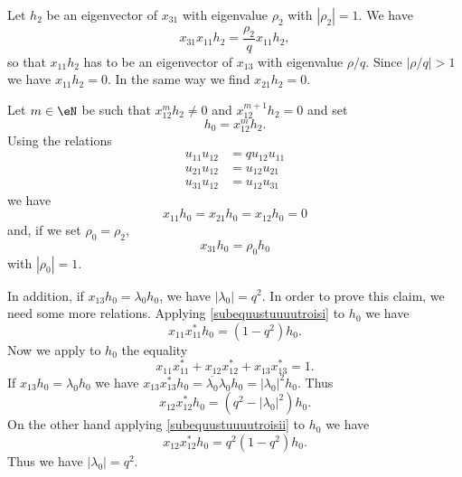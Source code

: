 Let \( h_2\) be an eigenvector of \( x_{31}\) with eigenvalue \( \rho_2\) with \( | \rho_2 |=1\). We have
\begin{equation}
	x_{31}x_{11}h_2=\frac{ \rho_2 }{ q }x_{11}h_2,
\end{equation}
so that \( x_{11}h_2\) has to be an eigenvector of \( x_{13}\) with eigenvalue \( \rho/q\). Since \( | \rho/q |>1\) we have \( x_{11}h_2=0\). In the same way we find \( x_{21}h_2=0\).

Let \( m\in\eN\) be such that \( x_{12}^mh_2\neq 0\) and \( x_{12}^{m+1}h_2=0\) and set
\begin{equation}
	h_0=x_{12}^mh_2.
\end{equation}
Using the relations
\begin{subequations}
	\begin{align}
		u_{11}u_{12} & =qu_{12}u_{11} \\
		u_{21}u_{12} & =u_{12}u_{21}  \\
		u_{31}u_{12} & =u_{12}u_{31}
	\end{align}
\end{subequations}
we have
\begin{equation}
	x_{11}h_0=x_{21}h_0=x_{12}h_0=0
\end{equation}
and, if we set \( \rho_0=\rho_2\),
\begin{equation}
	x_{31}h_0=\rho_0h_0
\end{equation}
with \( | \rho_0 |=1\).

In addition, if \( x_{13}h_0=\lambda_0h_0\), we have \( | \lambda_0 |=q^2\). In order to prove this claim, we need some more relations. Applying  \eqref{subequustuuuutroisi} to \( h_0\) we have
\begin{equation}
	x_{11}x_{11}^*h_0=(1-q^2)h_0.
\end{equation}
Now we apply to \( h_0\) the equality
\begin{equation}
	x_{11}x_{11}^*+x_{12}x_{12}^*+x_{13}x_{13}^*=1.
\end{equation}
If \( x_{13}h_0=\lambda_0h_0\) we have \( x_{13}x_{13}^*h_0=\overline{ \lambda_0 }\lambda_0h_0=| \lambda_0 |^2h_0\). Thus
\begin{equation}
	x_{12}x_{12}^*h_0=(q^2-| \lambda_0 |^2)h_0.
\end{equation}
On the other hand applying \eqref{subequustuuuutroisii} to \( h_0\) we have
\begin{equation}
	x_{12}x_{12}^*h_0=q^2(1-q^2)h_0.
\end{equation}
Thus we have \( | \lambda_0 |=q^2\).

